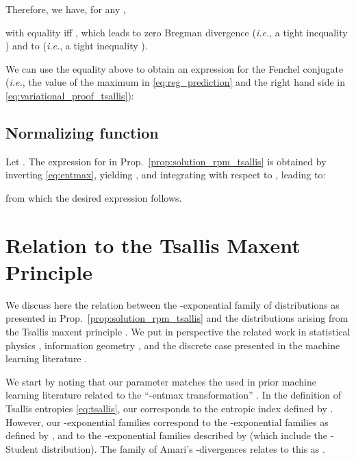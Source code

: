 \documentclass{article}
\begin{document}
Therefore, we have, for any ,

with equality iff , which leads to zero Bregman divergence ({\it i.e.}, a tight inequality ) and to 
 ({\it i.e.}, a tight inequality ).

We can use the equality above to obtain an expression for the Fenchel conjugate  ({\it i.e.}, the value of the maximum in \eqref{eq:reg_prediction} and the right hand side in \eqref{eq:variational_proof_tsallis}):


\subsection{Normalizing function }\label{sec:A_alpha}

Let . 
The expression for  in Prop.~\ref{prop:solution_rpm_tsallis} is
obtained by inverting \eqref{eq:entmax}, yielding
,  and integrating with respect to  , leading to:

from which the desired expression follows.


\begin{comment}
\section{Normalizing Function for -Sparse Families}\label{sec:A_alpha}

The expression for  in \eqref{eq:A_alpha} is
obtained by inverting \eqref{eq:alpha_sparse_family}, yielding
,  and integrating with respect to  , leading to:

\end{comment}



\section{Relation to the Tsallis Maxent Principle}\label{sec:tsallis_maxent}

We discuss here the relation between the -exponential family of distributions as presented in Prop.~\ref{prop:solution_rpm_tsallis} and the distributions arising from the Tsallis maxent principle \citep{Tsallis1988}. We put in perspective the related work in statistical physics \citep{abe2003geometry,naudts2009q}, information geometry \citep{amari2011geometry,amari2016information}, and the discrete case presented in the machine learning literature \citep{blondel2020learning,peters2019sparse}. 

We start by noting that our  parameter matches the  used in prior machine learning literature related to the ``-entmax transformation'' \citep{blondel2020learning,peters2019sparse}. In the definition of Tsallis entropies  \eqref{eq:tsallis}, our  corresponds to the entropic index  defined by \citet{Tsallis1988}. 
However, our -exponential families correspond to the -exponential families as defined by \citet{naudts2009q}, and to the -exponential families described by \citet{ding2010t} (which include the -Student distribution). The family of Amari's -divergences relates to this  as  \citep[\S4.3]{amari2016information}. 
\end{document}
